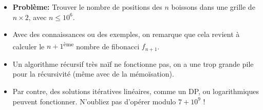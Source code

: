 \begin{frame}
    \frametitle{\problemtitle}
    \begin{itemize}
        \item<+-> \textbf{Problème:} Trouver le nombre de positions des $n$ boissons dans une grille de $n\times 2$, avec $n \le 10^{6}$.
        \item<+-> Avec des connaissances ou des exemples, on remarque que cela revient à calculer le $n+1$\textsuperscript{ème} nombre de fibonacci $f_{n+1}$.
        \item<+-> Un algorithme récursif très na\"if ne fonctionne pas, on a une trop grande pile pour la récursivité (même avec de la mémo\"isation).
        \item<+-> Par contre, des solutions itératives linéaires, comme un DP, ou logarithmiques peuvent fonctionner. N'oubliez pas d'opérer modulo $7+10^9$ !
    \end{itemize}
    \solvestats
\end{frame}
